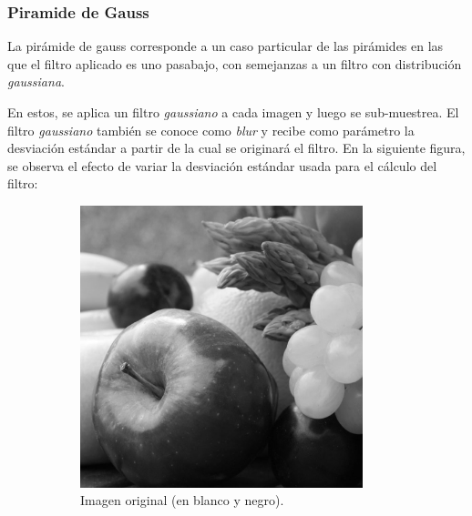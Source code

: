 \documentclass[12pt, letterpaper]{article}
\begin{document}
\subsubsection{Piramide de Gauss}
La pirámide de gauss corresponde a un caso particular de las pirámides en las que el filtro aplicado es uno pasabajo, con semejanzas a un filtro con distribución \textit{gaussiana}. 

\par En estos, se aplica un filtro \textit{gaussiano} a cada imagen y luego se sub-muestrea. El filtro  \textit{gaussiano} también se conoce como \textit{blur} y recibe como parámetro la desviación estándar a partir de la cual se originará el filtro. En la siguiente figura, se observa el efecto de variar la desviación estándar usada para el cálculo del filtro:

\begin{figure}[H]
  \centering
  \begin{subfigure}[t]{0.32\textwidth}
    \centering
    \includegraphics[width = 0.9\textwidth]{frutas.png}
    \caption{Imagen original (en blanco y negro).}
  \end{subfigure}
  ~
  \begin{subfigure}[t]{0.32\textwidth}
      \centering

\end{subfigure}
\end{figure}
\end{document}
